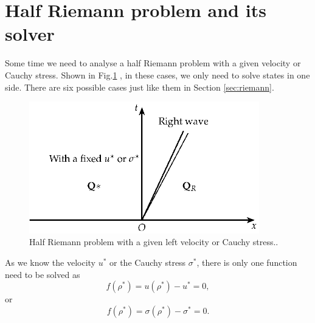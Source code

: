\documentclass{article}
\numberwithin{equation}{section}
\numberwithin{table}{section}
\begin{document}
%
%
%
\section{Half Riemann problem and its solver}
Some time we need to analyse a half Riemann problem with a given velocity or Cauchy stress. Shown in Fig.\ref{fig:half} , in these cases, we only need to solve states in one side. There are six possible cases just like them in Section \ref{sec:riemann}.

\begin{figure}
  \centering
  \includegraphics[width= 10cm] {Tikz-figure8.eps}
  \caption{Half Riemann problem  with a given left velocity or Cauchy stress..}
  \label{fig:half}
\end{figure}

As we know the velocity $u^*$ or the Cauchy stress $\sigma ^*$, there is only one function need to be solved as
\begin{equation}
  f(\rho^*) =u(\rho^*) - u^* = 0,
\end{equation}
or
\begin{equation}
  f(\rho^*) =\sigma(\rho^*) - \sigma^* = 0.
\end{equation}
\end{document}
